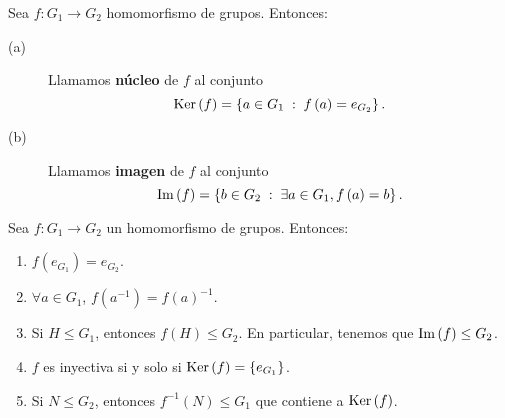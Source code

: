 \begin{definition}
Sea $\displaystyle f : G_{1} \to G_{2} $ homomorfismo de grupos. Entonces:
\begin{description}
\item[(a)] Llamamos \textbf{núcleo} de $\displaystyle f $ al conjunto
	\[\operatorname{Ker}\left(f\right) = \left\{ a \in G_{1} \; : \; f\left(a\right) = e _{G_{2}}\right\}  .\]
\item[(b)] Llamamos \textbf{imagen} de $\displaystyle f $ al conjunto
	\[\operatorname{Im}\left(f\right) = \left\{ b \in G_{2} \; : \; \exists a \in G_{1}, f\left(a\right) = b\right\}  .\]
\end{description}
\end{definition}
\begin{prop}
Sea $\displaystyle f : G_{1} \to G_{2} $ un homomorfismo de grupos. Entonces:
\begin{enumerate}
\item $\displaystyle f\left(e_{G_{1}}\right) = e_{G_{2}} $.
\item $\displaystyle \forall a \in G_{1} $, $\displaystyle f\left(a^{-1}\right) = f\left(a\right)^{-1} $.
\item Si $\displaystyle H \leq G_{1} $, entonces $\displaystyle f\left(H\right) \leq G_{2} $. En particular, tenemos que $\displaystyle \operatorname{Im}\left(f\right) \leq G_{2} $.
\item $\displaystyle f $ es inyectiva si y solo si $\displaystyle \operatorname{Ker}\left(f\right) = \left\{ e_{G_{1}}\right\}  $.
\item Si $\displaystyle N \leq G_{2} $, entonces $\displaystyle f^{-1}\left(N\right) \leq G_{1} $ que contiene a $\displaystyle \operatorname{Ker}\left(f\right) $.
\end{enumerate}
\end{prop}
